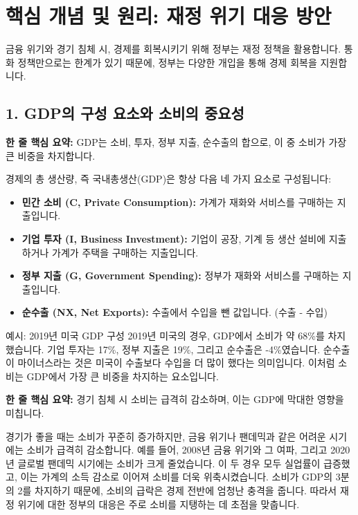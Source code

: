 \documentclass[11pt,a4paper]{article}
\begin{document}
\newpage
\section*{핵심 개념 및 원리: 재정 위기 대응 방안}

금융 위기와 경기 침체 시, 경제를 회복시키기 위해 정부는 재정 정책을 활용합니다. 통화 정책만으로는 한계가 있기 때문에, 정부는 다양한 개입을 통해 경제 회복을 지원합니다.

\subsection*{1. GDP의 구성 요소와 소비의 중요성}

\begin{tcolorbox}[mybox={GDP의 구성 요소}]
    \textbf{한 줄 핵심 요약:} GDP는 소비, 투자, 정부 지출, 순수출의 합으로, 이 중 소비가 가장 큰 비중을 차지합니다.
\end{tcolorbox}

경제의 총 생산량, 즉 국내총생산(GDP)은 항상 다음 네 가지 요소로 구성됩니다:
\begin{itemize}
    \item \textbf{민간 소비 (C, Private Consumption):} 가계가 재화와 서비스를 구매하는 지출입니다.
    \item \textbf{기업 투자 (I, Business Investment):} 기업이 공장, 기계 등 생산 설비에 지출하거나 가계가 주택을 구매하는 지출입니다.
    \item \textbf{정부 지출 (G, Government Spending):} 정부가 재화와 서비스를 구매하는 지출입니다.
    \item \textbf{순수출 (NX, Net Exports):} 수출에서 수입을 뺀 값입니다. (수출 - 수입)
\end{itemize}

\begin{examplebox}{예시: 2019년 미국 GDP 구성}
    2019년 미국의 경우, GDP에서 소비가 약 68\%를 차지했습니다. 기업 투자는 17\%, 정부 지출은 19\%, 그리고 순수출은 -4\%였습니다. 순수출이 마이너스라는 것은 미국이 수출보다 수입을 더 많이 했다는 의미입니다. 이처럼 소비는 GDP에서 가장 큰 비중을 차지하는 요소입니다.
\end{examplebox}

\begin{tcolorbox}[mybox={경기 침체 시 소비의 변화}]
    \textbf{한 줄 핵심 요약:} 경기 침체 시 소비는 급격히 감소하며, 이는 GDP에 막대한 영향을 미칩니다.
\end{tcolorbox}

경기가 좋을 때는 소비가 꾸준히 증가하지만, 금융 위기나 팬데믹과 같은 어려운 시기에는 소비가 급격히 감소합니다. 예를 들어, 2008년 금융 위기와 그 여파, 그리고 2020년 글로벌 팬데믹 시기에는 소비가 크게 줄었습니다. 이 두 경우 모두 실업률이 급증했고, 이는 가계의 소득 감소로 이어져 소비를 더욱 위축시켰습니다. 소비가 GDP의 3분의 2를 차지하기 때문에, 소비의 급락은 경제 전반에 엄청난 충격을 줍니다. 따라서 재정 위기에 대한 정부의 대응은 주로 소비를 지탱하는 데 초점을 맞춥니다.
\end{document}
